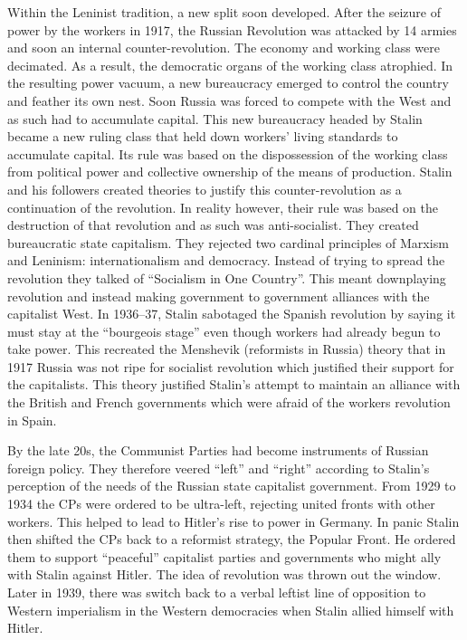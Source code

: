 Within the Leninist tradition, a new split soon developed. After the seizure of power by the workers in 1917, the Russian Revolution was attacked by 14 armies and soon an internal counter-revolution. The economy and working class were decimated. As a result, the democratic organs of the working class atrophied. In the resulting power vacuum, a new bureaucracy emerged to control the country and feather its own nest. Soon Russia was forced to compete with the West and as such had to accumulate capital. This new bureaucracy headed by Stalin became a new ruling class that held down workers' living standards to accumulate capital. Its rule was based on the dispossession of the working class from political power and collective ownership of the means of production. Stalin and his followers created theories to justify this counter-revolution as a continuation of the revolution. In reality however, their rule was based on the destruction of that revolution and as such was anti-socialist. They created bureaucratic state capitalism. They rejected two cardinal principles of Marxism and Leninism: internationalism and democracy. Instead of trying to spread the revolution they talked of ``Socialism in One Country''. This meant downplaying revolution and instead making government to government alliances with the capitalist West. In 1936--37, Stalin sabotaged the Spanish revolution by saying it must stay at the ``bourgeois stage'' even though workers had already begun to take power. This recreated the Menshevik (reformists in Russia) theory that in 1917 Russia was not ripe for socialist revolution which justified their support for the capitalists. This theory justified Stalin's attempt to maintain an alliance with the British and French governments which were afraid of the workers revolution in Spain.

By the late 20s, the Communist Parties had become instruments of Russian foreign policy. They therefore veered ``left'' and ``right'' according to Stalin's perception of the needs of the Russian state capitalist government. From 1929 to 1934 the CPs were ordered to be ultra-left, rejecting united fronts with other workers. This helped to lead to Hitler's rise to power in Germany. In panic Stalin then shifted the CPs back to a reformist strategy, the Popular Front. He ordered them to support ``peaceful'' capitalist parties and governments who might ally with Stalin against Hitler. The idea of revolution was thrown out the window. Later in 1939, there was switch back to a verbal leftist line of opposition to Western imperialism in the Western democracies when Stalin allied himself with Hitler.

